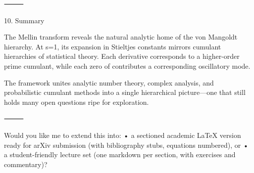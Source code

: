 ⸻

10. Summary

The Mellin transform reveals the natural analytic home of the von Mangoldt hierarchy.
At s=1, its expansion in Stieltjes constants mirrors cumulant hierarchies of statistical theory.
Each derivative corresponds to a higher-order prime cumulant, while each zero of \zeta contributes a corresponding oscillatory mode.

The framework unites analytic number theory, complex analysis, and probabilistic cumulant methods into a single hierarchical picture—one that still holds many open questions ripe for exploration.

⸻

Would you like me to extend this into:
	•	a sectioned academic LaTeX version ready for arXiv submission (with bibliography stubs, equations numbered), or
	•	a student-friendly lecture set (one markdown per section, with exercises and commentary)?